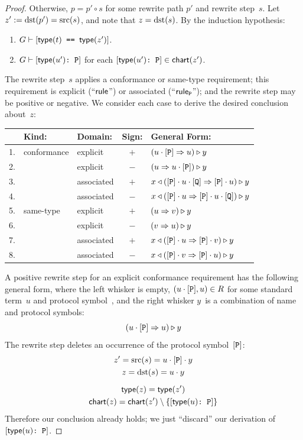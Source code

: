 \documentclass[../generics]{subfiles}
\begin{document}
\begin{proof}
\InductiveStep Otherwise, $p=p' \circ s$ for some rewrite path $p'$ and rewrite step~$s$. Let $z' := \operatorname{dst}(p') = \operatorname{src}(s)$, and note that $z=\operatorname{dst}(s)$. By the induction hypothesis:
\begin{enumerate}
\item $G \vdash [\texttt{$\mathsf{type}(t)$ == $\mathsf{type}(z')$}]$.
\item $G \vdash [\texttt{$\mathsf{type}(u')$:~P}]$ for each $[\texttt{$\mathsf{type}(u')$:~P}]\in\mathsf{chart}(z')$.
\end{enumerate}
The rewrite step~$s$ applies a conformance or same-type requirement; this requirement is explicit (``$\mathsf{rule}$'') or associated (``$\mathsf{rule}_{\texttt{P}}$''); and the rewrite step may be positive or negative. We consider each case to derive the desired conclusion about~$z$:
\begin{center}
\begin{tabular}{lllcl}
\toprule
&\textbf{Kind:}&\textbf{Domain:}&\textbf{Sign:}&\textbf{General Form:}\\
\midrule
1.&conformance&explicit&$+$&$(u\cdot[\texttt{P}]\Rightarrow u)\triangleright y$\\
2.&&explicit&$-$&$(u\Rightarrow u\cdot[\texttt{P}])\triangleright y$\\
3.&&associated&$+$&$x\triangleleft([\texttt{P}]\cdot u\cdot[\texttt{Q}]\Rightarrow[\texttt{P}]\cdot u)\triangleright y$\\
4.&&associated&$-$&$x\triangleleft([\texttt{P}]\cdot u\Rightarrow[\texttt{P}]\cdot u\cdot[\texttt{Q}])\triangleright y$\\
\midrule
5.&same-type&explicit&$+$&$(u\Rightarrow v)\triangleright y$\\
6.&&explicit&$-$&$(v\Rightarrow u)\triangleright y$\\
7.&&associated&$+$&$x\triangleleft([\texttt{P}]\cdot u\Rightarrow[\texttt{P}]\cdot v)\triangleright y$\\
8.&&associated&$-$&$x\triangleleft([\texttt{P}]\cdot v\Rightarrow[\texttt{P}]\cdot u)\triangleright y$\\
\bottomrule
\end{tabular}
\end{center}

 A positive rewrite step for an explicit conformance requirement has the following general form, where the left whisker is empty, $(u\cdot[\texttt{P}],u)\in R$ for some standard term~$u$ and protocol symbol~\pP, and the right whisker $y$~is a combination of name and protocol symbols:
\[(u\cdot[\texttt{P}]\Rightarrow u)\triangleright y\]
The rewrite step deletes an occurrence of the protocol symbol~$[\texttt{P}]$:
\begin{gather*}
z'=\operatorname{src}(s)=u\cdot[\texttt{P}]\cdot y\\
z=\operatorname{dst}(s)=u\cdot y\\[\medskipamount]
\mathsf{type}(z)=\mathsf{type}(z')\\
\mathsf{chart}(z)=\mathsf{chart}(z') \setminus \{[\texttt{$\mathsf{type}(u)$:~P}]\}
\end{gather*}
Therefore our conclusion already holds; we just ``discard'' our derivation of $[\texttt{$\mathsf{type}(u)$:~P}]$.


\end{proof}
\end{document}
